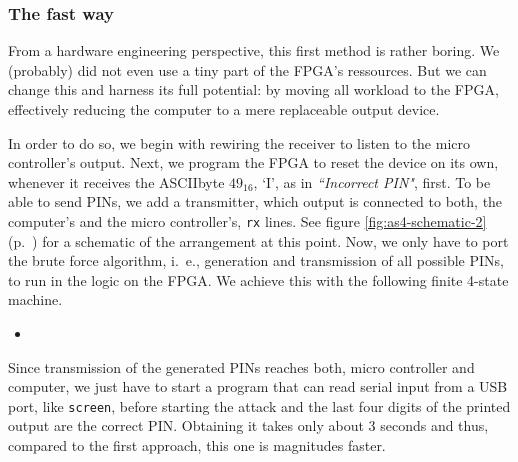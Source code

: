 \subsubsection*{The fast way}
From a hardware engineering perspective, this first method is rather boring. We (probably) did not even use a tiny part of the FPGA's ressources. 
But we can change this and harness its full potential: by moving all workload to the FPGA, effectively reducing the computer to a mere replaceable output device. 

In order to do so, we begin with rewiring the receiver to listen to the micro controller's output.
Next, we program the FPGA to reset the device on its own, whenever it receives the ASCIIbyte $49_{16}$, `I', as in \textit{``Incorrect PIN"}, first. 
To be able to send PINs, we add a transmitter, which output is connected to both, the computer's and the micro controller's, \texttt{rx} lines. 
See figure \ref{fig:as4-schematic-2} (p.~\pageref{fig:as4-schematic-2}) for a schematic of the arrangement at this point.
Now, we only have to port the brute force algorithm, i.~e., generation and transmission of all possible PINs, to run in the logic on the FPGA. We achieve this with the following finite 4-state machine.

\begin{itemize}
    \item[] 
\end{itemize}

Since transmission of the generated PINs reaches both, micro controller and computer, we just have to start a program that can read serial input from a USB port, like \texttt{screen}, before starting the attack and the last four digits of the printed output are the correct PIN. Obtaining it takes only about 3 seconds and thus, compared to the first approach, this one is magnitudes faster.

